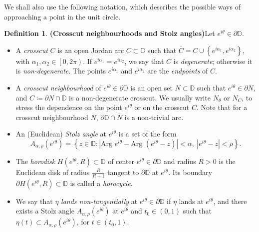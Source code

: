 \documentclass[11pt,a4paper,reqno]{amsart}
\theoremstyle{plain}
\theoremstyle{definition}
\newtheorem{defi}[thm]{Definition}
\theoremstyle{plain}
\begin{document}
We shall also use the following notation, which describes the possible ways of approaching a point in the unit circle.
\begin{defi}{\bf (Crosscut neighbourhoods and Stolz angles)}\label{def:cc-nbhd-stolz}
	Let $ e^{i\theta}\in\partial\mathbb{D} $.
	\begin{itemize}
		\item 	A \textit{crosscut} $ C $ is an open Jordan arc $ C\subset\mathbb{D} $ such that $ \overline{C}=C\cup \left\lbrace e^{i\alpha_1},e^{i\alpha_2}\right\rbrace  $, with $ \alpha_1, \alpha_2\in \left[ 0, 2\pi\right) $. If $ e^{i\alpha_1}=e^{i\alpha_2} $, we say that $ C $ is {\em degenerate}; otherwise it is {\em non-degenerate}. The points $ e^{i\alpha_1} $ and $ e^{i\alpha_2} $ are the \textit{endpoints} of $ C $.
		
		\item A \textit{crosscut neighbourhood} of $ e^{i\theta} \in\partial\mathbb{D}$ is an open set $ N\subset\mathbb{D} $ such that $ e^{i\theta}\in\partial N$, and $C\coloneqq \partial N \cap\mathbb{D} $ is a  non-degenerate crosscut.
		We usually write $ N_\theta$ or  $ N_C $, to stress the  dependence on the point $e^{i\theta}$ or on the crosscut $ C $.
		Note that for a crosscut neighbourhood $ N $, $ \partial\mathbb{D}\cap \overline{N} $ is a non-trivial arc.
		\item An (Euclidean) \textit{Stolz angle} at $e^{i\theta}$ is a set of the form 	\[A_{\alpha, \rho}(e^{i\theta})=\left\lbrace z\in\mathbb{D}\colon \left| \textrm{Arg }e^{i\theta}- \textrm{Arg }(e^{i\theta}-z)\right| <\alpha, \ \left| e^{i\theta}- z \right| <\rho \right\rbrace .\]
		\item The {\em horodisk} $ H(e^{i\theta}, R) \subset \mathbb{D}$ of center $ e^{i\theta}\in\partial\mathbb{D} $ and radius $ R>0 $ is the Euclidean disk of radius $ \frac{R}{R+1} $ tangent to $ \partial \mathbb{D} $ at $ e^{i\theta} $.  Its boundary $ \partial H(e^{i\theta}, R) \subset \mathbb{D}$ is called a {\em horocycle}. %
		\item We say that  $ \eta$ \textit{lands non-tangentially} at $e^{i\theta}\in\partial\mathbb{D}$  if $ \eta $ lands at $e^{i\theta}$, and there exists a Stolz angle $ A_{\alpha, \rho} (e^{i\theta})$ at $ e^{i\theta} $  and $ t_0\in (0,1) $ such that  $ \eta(t)\subset A_{\alpha, \rho}(e^{i\theta})  $, for $ t\in (t_0, 1) $.
	\end{itemize}
\end{defi}
\end{document}
